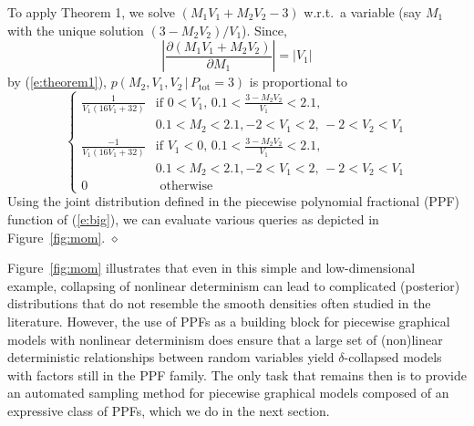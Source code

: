 \documentclass[letterpaper]{article}
\newcommand{\otherwise}[1]{#1 &\text{ otherwise}}
\newcommand{\pr}{p}
\begin{document}
To apply Theorem 1, we solve {\footnotesize$(M_1 V_1 + M_2 V_2 - 3)$}
w.r.t.\ a variable (say $M_1$ with the unique solution {\footnotesize$(3 - M_2 V_2)/V_1$}).
Since,  
{\footnotesize
$$\left| \frac{\partial (M_1 V_1 + M_2 V_2)}{\partial M_1} \right| = |V_1|
$$
}
by (\ref{e:theorem1}),
$\pr(M_2, V_1, V_2 \,|\, P_\text{tot} = 3)$ is proportional to
{\footnotesize
\begin{equation}\label{e:big}  
\begin{cases}
\frac{1}{V_1(16 V_1 + 32)} &{\text{if }\scriptstyle 0<V_1, \, 0.1<\frac{3-M_2 V_2}{V_1}<2.1,}\\
							 &{\scriptstyle 0.1<M_2<2.1, -2<V_1<2, \, -2<V_2 < V_1}\\
\frac{-1}{V_1(16 V_1 + 32)} &{\text{if }\scriptstyle V_1<0, \, 0.1<\frac{3-M_2 V_2}{V_1}<2.1,}\\
							 &{\scriptstyle 0.1<M_2<2.1, -2<V_1<2, \, -2<V_2 < V_1}\\
 \otherwise{0}
 \end{cases}
\end{equation}
}
Using the joint distribution defined in 
the piecewise polynomial fractional (PPF) function
of (\ref{e:big}), we can evaluate various queries
as depicted in Figure~\ref{fig:mom}.
\hspace*{\fill} $\diamond$ 

Figure~\ref{fig:mom} illustrates that even in this simple and
low-dimensional example, collapsing of nonlinear determinism can lead
to complicated (posterior) distributions that do not resemble the
smooth densities often studied in the literature.  However, the use of
PPFs as a building block for piecewise graphical models with nonlinear
determinism does ensure that a large set of (non)linear deterministic
relationships between random variables yield $\delta$-collapsed models
with factors still in the PPF family.  The only task that remains then
is to provide an automated sampling method for piecewise graphical
models composed of an expressive class of PPFs, which we do in the
next section.
\end{document}
